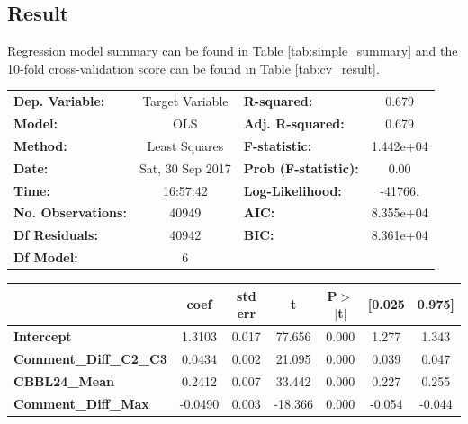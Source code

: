 \documentclass[]{article}
\begin{document}
\subsection{Result}
Regression model summary can be found in Table \ref{tab:simple_summary} and the 10-fold cross-validation score can be found in Table \ref{tab:cv_result}.

\begin{table}
\begin{center}
	\begin{tabular}{lclc}
		\toprule
		\textbf{Dep. Variable:}          & Target Variable  & \textbf{  R-squared:         } &     0.679   \\
		\textbf{Model:}                  &       OLS        & \textbf{  Adj. R-squared:    } &     0.679   \\
		\textbf{Method:}                 &  Least Squares   & \textbf{  F-statistic:       } & 1.442e+04   \\
		\textbf{Date:}                   & Sat, 30 Sep 2017 & \textbf{  Prob (F-statistic):} &     0.00    \\
		\textbf{Time:}                   &     16:57:42     & \textbf{  Log-Likelihood:    } &   -41766.   \\
		\textbf{No. Observations:}       &       40949      & \textbf{  AIC:               } & 8.355e+04   \\
		\textbf{Df Residuals:}           &       40942      & \textbf{  BIC:               } & 8.361e+04   \\
		\textbf{Df Model:}               &           6      & \textbf{                     } &             \\
		\bottomrule
	\end{tabular}
	\begin{tabular}{lcccccc}
		& \textbf{coef} & \textbf{std err} & \textbf{t} & \textbf{P$>$$|$t$|$} & \textbf{[0.025} & \textbf{0.975]}  \\
		\midrule
		\textbf{Intercept}               &       1.3103  &        0.017     &    77.656  &         0.000        &        1.277    &        1.343     \\
		\textbf{Comment\_Diff\_C2\_C3}   &       0.0434  &        0.002     &    21.095  &         0.000        &        0.039    &        0.047     \\
		\textbf{CBBL24\_Mean}            &       0.2412  &        0.007     &    33.442  &         0.000        &        0.227    &        0.255     \\
		\textbf{Comment\_Diff\_Max}      &      -0.0490  &        0.003     &   -18.366  &         0.000        &       -0.054    &       -0.044     \\

\end{tabular}
\end{center}
\end{table}
\end{document}
